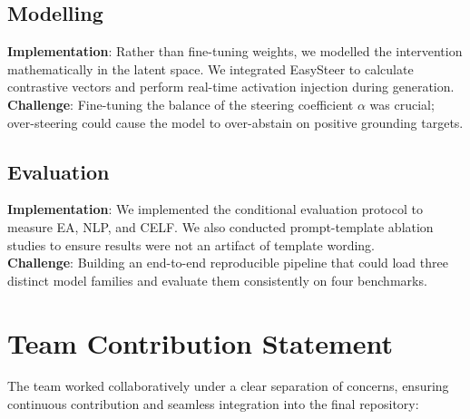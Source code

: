 \documentclass[12pt,a4paper]{article}
\begin{document}
\subsection{Modelling}
\textbf{Implementation}: Rather than fine-tuning weights, we modelled the intervention mathematically in the latent space. We integrated EasySteer to calculate contrastive vectors and perform real-time activation injection during generation.\\
\textbf{Challenge}: Fine-tuning the balance of the steering coefficient $\alpha$ was crucial; over-steering could cause the model to over-abstain on positive grounding targets.

\subsection{Evaluation}
\textbf{Implementation}: We implemented the conditional evaluation protocol to measure EA, NLP, and CELF. We also conducted prompt-template ablation studies to ensure results were not an artifact of template wording.\\
\textbf{Challenge}: Building an end-to-end reproducible pipeline that could load three distinct model families and evaluate them consistently on four benchmarks.

\section{Team Contribution Statement}

The team worked collaboratively under a clear separation of concerns, ensuring continuous contribution and seamless integration into the final repository:
\end{document}
